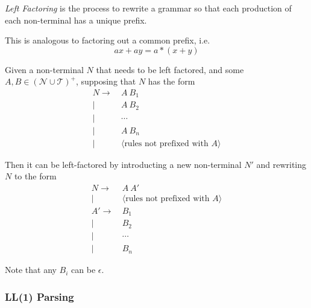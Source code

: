 \begin{definition}
    \textit{Left Factoring} is the process to rewrite a grammar so that each production of each non-terminal has a unique prefix.
    
    This is analogous to factoring out a common prefix, i.e.
    \begin{equation}
        ax + ay = a * (x + y)
    \end{equation}
    
    Given a non-terminal $N$ that needs to be left factored, and some $A, B \in (\mathcal{N} \cup \mathcal{T})^+$, supposing that $N$ has the form
    \begin{equation}
        \begin{aligned}
            N \to  &\ A\ B_1 \\
              \mid &\ A\ B_2 \\
              \mid &\ \cdots \\
              \mid &\ A\ B_n \\
              \mid &\ \langle \text{rules not prefixed with\ } A \rangle
        \end{aligned}
    \end{equation}
    
    Then it can be left-factored by introducting a new non-terminal $N\prime$ and rewriting $N$ to the form
    \begin{equation}
        \begin{aligned}
            N \to  &\ A\ A\prime \\
              \mid &\ \langle \text{rules not prefixed with\ } A \rangle \\
            A\prime \to  &\ B_1 \\
                    \mid &\ B_2 \\
                    \mid &\ \cdots \\
                    \mid &\ B_n
        \end{aligned}
    \end{equation}
    
    Note that any $B_i$ can be $\epsilon$.
\end{definition}

\subsubsection{LL(1) Parsing}

